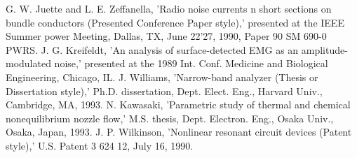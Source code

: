 \documentclass[letterpaper, 10 pt, conference]{ieeeconf}  %
\begin{document}
\begin{thebibliography}{99}
 G. W. Juette and L. E. Zeffanella, 'Radio noise currents n short sections on bundle conductors (Presented Conference Paper style),' presented at the IEEE Summer power Meeting, Dallas, TX, June 22'27, 1990, Paper 90 SM 690-0 PWRS.
 J. G. Kreifeldt, 'An analysis of surface-detected EMG as an amplitude-modulated noise,' presented at the 1989 Int. Conf. Medicine and Biological Engineering, Chicago, IL.
 J. Williams, 'Narrow-band analyzer (Thesis or Dissertation style),' Ph.D. dissertation, Dept. Elect. Eng., Harvard Univ., Cambridge, MA, 1993. 
 N. Kawasaki, 'Parametric study of thermal and chemical nonequilibrium nozzle flow,' M.S. thesis, Dept. Electron. Eng., Osaka Univ., Osaka, Japan, 1993.
 J. P. Wilkinson, 'Nonlinear resonant circuit devices (Patent style),' U.S. Patent 3 624 12, July 16, 1990. 






\end{thebibliography}
\end{document}
